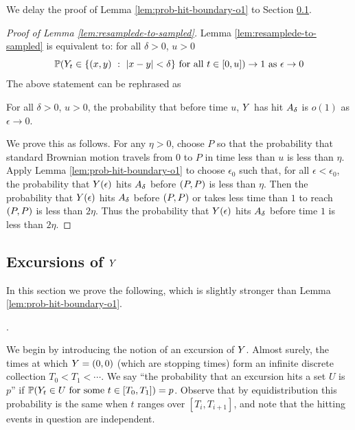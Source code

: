 {We delay the proof of Lemma \ref{lem:prob-hit-boundary-o1} to Section
\ref{subsec:excursions-of-twodim}.

\begin{proof}[Proof of Lemma \ref{lem:resamplede-to-sampled}]

Lemma \ref{lem:resamplede-to-sampled} is equivalent to: for all $\delta > 0$, $u > 0$
\[
\P(\twodim_t \in \{(x,y) \ :\  |x-y|<\delta \} \text{ for all } t \in [0,u])\to1 \text{ as } \epsilon\to 0
\]
The above statement can be rephrased as

\vspace{12pt}
For all $\delta > 0$, $u > 0$,
the probability that before time $u$, $Y$ has hit $A_\delta$
is $o(1)$ as $\epsilon \to 0$.
\vspace{12pt}

  We prove this as follows.  For any $\eta > 0$,
  choose $P$ so that the probability that standard Brownian motion
  travels from $0$ to $P$ in time less than $u$ is less than
  $\eta$.
  Apply Lemma \ref{lem:prob-hit-boundary-o1} to
  choose $\epsilon_0$ such that, for all $\epsilon < \epsilon_0$, the probability that $Y(\epsilon)$ hits
  $A_\delta$ before $(P,P)$ is less than $\eta$.
  Then the probability that $Y(\epsilon)$ hits $A_\delta$ before $(P,P)$
  or takes less time than $1$ to reach $(P,P)$ is
  less than $2\eta$.
  Thus the probability that $Y(\epsilon)$ hits $A_\delta$ before
  time $1$ is less than $2\eta$.
\end{proof}

\subsection{Excursions of $Y$}
\label{subsec:excursions-of-twodim}

In this section we prove the following, which is slightly stronger than
Lemma \ref{lem:prob-hit-boundary-o1}.

\newcommand{\loger}{\log 1/\epsilon}

\begin{lemma}\label{lem:prob-hit-boundary-o1loge}
  \probhitboundaryis{$O(\frac{1}{\loger})$}.
\end{lemma}

\newcommand{\origin}{(0,0)}

\newcommand{\excursionstart}{T}
  We begin by introducing the notion of an excursion of $Y$.
  Almost surely, the times at which $\twodim = \origin$ (which are stopping
  times) form an infinite discrete collection $\excursionstart_0 <
  \excursionstart_1 < \cdots$. We say ``the probability that an excursion
  hits a set $U$ is $p$'' if $\P(\twodim_t\in U \text{
  for some } t\in [\excursionstart_0, \excursionstart_{1}]) = p$.
  Observe that by equidistribution this probability is the same when
  $t$ ranges over $[\excursionstart_i, \excursionstart_{i+1}]$, and
  note that the hitting events in question are independent.

}
